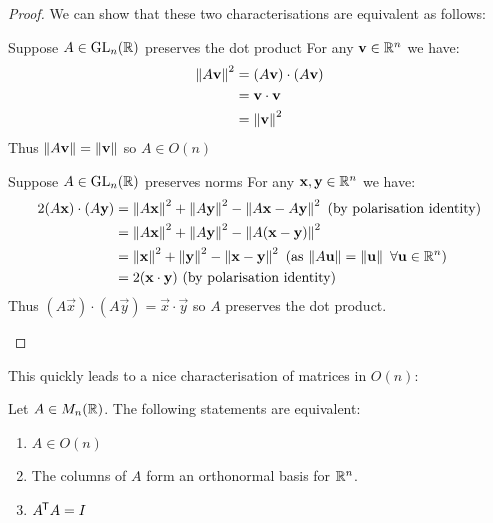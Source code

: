 \documentclass[../main.tex]{subfiles}
\begin{document}
\begin{proof}
  We can show that these two characterisations are equivalent as follows:
  \begin{proofdirection}{Suppose $A \in \mathrm{GL}_n(\mathbb{R})$ preserves the dot product}
    For any $\mathbf{\bm{v}} \in \mathbb{R}^{n}$ we have:
    \begin{align*}
      \left\lVert A \mathbf{\bm{v}} \right\rVert^2 &= (A \mathbf{\bm{v}}) \cdot (A \mathbf{\bm{v}}) \\
                      &= \mathbf{\bm{v}} \cdot \mathbf{\bm{v}} \\
                      &= \left\lVert \mathbf{\bm{v}} \right\rVert^2
    \end{align*}
    Thus $\left\lVert A \mathbf{\bm{v}} \right\rVert = \left\lVert \mathbf{\bm{v}} \right\rVert$ so $A \in O(n)$
  \end{proofdirection}
  \begin{proofdirection}{Suppose $A \in \mathrm{GL}_n(\mathbb{R})$ preserves norms}
    For any $\mathbf{\bm{x}}, \mathbf{\bm{y}} \in \mathbb{R}^{n}$ we have:
    \begin{align*}
      2(A \mathbf{\bm{x}}) \cdot (A \mathbf{\bm{y}}) &= \left\lVert A\mathbf{\bm{x}} \right\rVert^2 + \left\lVert A\mathbf{\bm{y}} \right\rVert^2 - \left\lVert A\mathbf{\bm{x}} - A\mathbf{\bm{y}} \right\rVert^2 \text{ (by polarisation identity)}\\
                                     &= \left\lVert A\mathbf{\bm{x}} \right\rVert^2 + \left\lVert A\mathbf{\bm{y}} \right\rVert^2 - \left\lVert A(\mathbf{\bm{x}} - \mathbf{\bm{y}}) \right\rVert^2 \\
                                     &= \left\lVert \mathbf{\bm{x}} \right\rVert^2 + \left\lVert \mathbf{\bm{y}} \right\rVert^2 - \left\lVert \mathbf{\bm{x}} - \mathbf{\bm{y}} \right\rVert^2 \text{ (as $\left\lVert A\mathbf{\bm{u}} \right\rVert = \left\lVert \mathbf{\bm{u}} \right\rVert\ \forall \mathbf{\bm{u}} \in \mathbb{R}^{n}$)}\\
                                     &= 2(\mathbf{\bm{x}} \cdot \mathbf{\bm{y}}) \text{ (by polarisation identity)}
    \end{align*}
    Thus $(A\vec{x})\cdot(A \vec{y}) = \vec{x} \cdot \vec{y}$ so $A$ preserves the dot product.
  \end{proofdirection}
\end{proof}
This quickly leads to a nice characterisation of matrices in $O(n)$:
\begin{lemma}[Matrices in $O(n)$]
  Let $A \in M_n(\mathbb{R})$.
  The following statements are equivalent:
  \begin{enumerate}
    \item $A \in O(n)$
    \item The columns of $A$ form an orthonormal basis for $\mathbb{R}^{n}$.
    \item $A^{{\mkern-1.5mu\mathsf{T}}} A = I$
  \end{enumerate}
\end{lemma}
\end{document}
